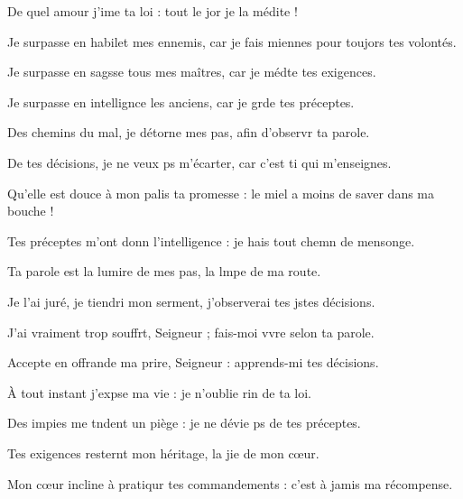 \item De quel amour j’ime ta loi :\psstar{} tout le jor je la médite !
\item Je surpasse en habilet mes ennemis,\psstar{} car je fais miennes pour toujors tes volontés.
\item Je surpasse en sagsse tous mes maîtres,\psstar{} car je médte tes exigences.
\item Je surpasse en intellignce les anciens,\psstar{} car je grde tes préceptes.
\item Des chemins du mal, je détorne mes pas,\psstar{} afin d’observr ta parole.
\item De tes décisions, je ne veux ps m’écarter,\psstar{} car c’est ti qui m’enseignes.
\item Qu’elle est douce à mon palis ta promesse :\psstar{} le miel a moins de saver dans ma bouche !
\item Tes préceptes m’ont donn l’intelligence :\psstar{} je hais tout chemn de mensonge.
\item Ta parole est la lumire de mes pas,\psstar{} la lmpe de ma route.
\item Je l’ai juré, je tiendri mon serment,\psstar{} j’observerai tes jstes décisions.
\item J’ai vraiment trop souffrt, Seigneur ;\psstar{} fais-moi vvre selon ta parole.
\item Accepte en offrande ma prire, Seigneur :\psstar{} apprends-mi tes décisions.
\item À tout instant j’expse ma vie :\psstar{} je n’oublie rin de ta loi.
\item Des impies me tndent un piège :\psstar{} je ne dévie ps de tes préceptes.
\item Tes exigences resternt mon héritage,\psstar{} la jie de mon cœur.
\item Mon cœur incline à pratiqur tes commandements :\psstar{} c’est à jamis ma récompense.